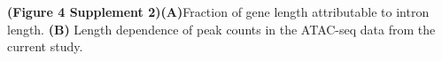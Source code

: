 \textbf{(Figure 4 Supplement 2)}\textbf{(A)}Fraction of gene length attributable to intron
length. \textbf{(B)} Length dependence of peak counts in the ATAC-seq data from the current study.

